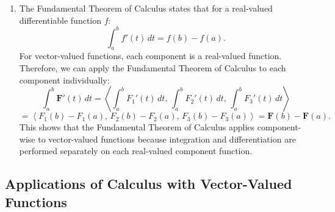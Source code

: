 \begin{example}
\begin{solution}
\begin{enumerate}
    \textbf{First component:}
    \[
    \int_0^1 6t \, dt = \left[ 3t^2 \right]_0^1 = 3(1)^2 - 3(0)^2 = 3.
    \]

    \textbf{Second component:}
    \[
    \int_0^1 2\cos t \, dt = 2\sin t \bigg|_0^1 = 2\sin 1 - 2\sin 0 = 2\sin 1 - 0 = 2\sin 1.
    \]

    \textbf{Third component:}
    \[
    \int_0^1 2e^{2t} \, dt = \left[ e^{2t} \right]_0^1 = e^{2} - e^{0} = e^{2} - 1.
    \]

    Now compute \(\mathbf{F}(1) - \mathbf{F}(0)\):
    \[
    \mathbf{F}(1) = \left\langle 3(1)^2, \, 2\sin 1, \, e^{2(1)} \right\rangle = \left\langle 3, \, 2\sin 1, \, e^{2} \right\rangle.
    \]
    \[
    \mathbf{F}(0) = \left\langle 3(0)^2, \, 2\sin 0, \, e^{2(0)} \right\rangle = \left\langle 0, \, 0, \, 1 \right\rangle.
    \]
    Therefore,
    \[
    \mathbf{F}(1) - \mathbf{F}(0) = \left\langle 3 - 0, \, 2\sin 1 - 0, \, e^{2} - 1 \right\rangle = \left\langle 3, \, 2\sin 1, \, e^{2} - 1 \right\rangle.
    \]
    Comparing the results:
    \[
    \int_0^1 \mathbf{F}'(t) \, dt = \left\langle 3, \, 2\sin 1, \, e^{2} - 1 \right\rangle = \mathbf{F}(1) - \mathbf{F}(0).
    \]
    Thus, we have verified that \(\displaystyle \int_0^1 \mathbf{F}'(t) \, dt = \mathbf{F}(1) - \mathbf{F}(0)\).

    \item The Fundamental Theorem of Calculus states that for a real-valued differentiable function \( f \):
    \[
    \int_a^b f'(t) \, dt = f(b) - f(a).
    \]
    For vector-valued functions, each component is a real-valued function. Therefore, we can apply the Fundamental Theorem of Calculus to each component individually:
    \[
    \int_a^b \mathbf{F}'(t) \, dt = \left\langle \int_a^b F_1'(t) \, dt, \, \int_a^b F_2'(t) \, dt, \, \int_a^b F_3'(t) \, dt \right\rangle \]
\[= \left\langle F_1(b) - F_1(a), \, F_2(b) - F_2(a), \, F_3(b) - F_3(a) \right\rangle = \mathbf{F}(b) - \mathbf{F}(a).
    \]
    This shows that the Fundamental Theorem of Calculus applies component-wise to vector-valued functions because integration and differentiation are performed separately on each real-valued component function.
\end{enumerate}
\end{solution}
\end{example}
\exampleline





\subsection*{Applications of Calculus with Vector-Valued Functions}

